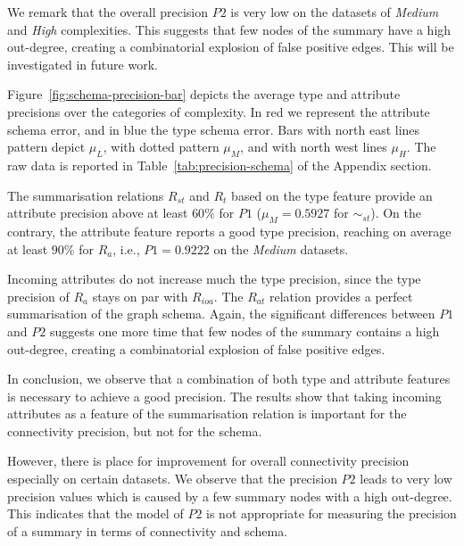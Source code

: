 We remark that the overall precision $P2$ is very low on the datasets of \emph{Medium} and \emph{High} complexities. This suggests that few nodes of the summary have a high out-degree, creating a combinatorial explosion of false positive edges. This will be investigated in future work.




Figure~\ref{fig:schema-precision-bar} depicts the average type and attribute precisions over the categories of complexity.
In red we represent the attribute schema error, and in blue the type schema error. Bars with north east lines pattern depict $\mu_{L}$, with dotted pattern $\mu_{M}$, and with north west lines $\mu_{H}$.
The raw data is reported in Table~\ref{tab:precision-schema} of the Appendix section.

The summarisation relations $R_{st}$ and $R_t$ based on the type feature provide an attribute precision above at least $60\%$ for $P1$ ($\mu_M=0.5927$ for $\sim_{st}$).
On the contrary, the attribute feature reports a good type precision, reaching on average at least $90\%$ for $R_a$, i.e., $P1=0.9222$ on the \emph{Medium} datasets.

Incoming attributes do not increase much the type precision, since the type precision of $R_a$ stays on par with $R_{ioa}$. The $R_{at}$ relation provides a perfect summarisation of the graph schema. Again, the significant differences between $P1$ and $P2$ suggests one more time that few nodes of the summary contains a high out-degree, creating a combinatorial explosion of false positive edges.




In conclusion, we observe that a combination of both type and attribute features is necessary to achieve a good precision. The results show that taking incoming attributes as a feature of the summarisation relation is important for the connectivity precision, but not for the schema.

However, there is place for improvement for overall connectivity precision especially on certain datasets. We observe that the precision $P2$ leads to very low precision values which is caused by a few summary nodes with a high out-degree. This indicates that the model of $P2$ is not appropriate for measuring the precision of a summary in terms of connectivity and schema.

